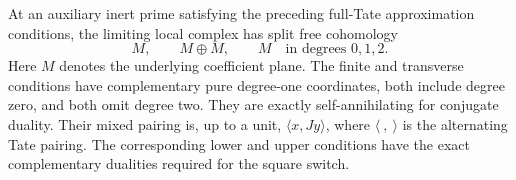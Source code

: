 \begin{lemma}\label{split-local:inert-planes}
At an auxiliary inert prime satisfying the preceding full-Tate approximation conditions, the limiting local complex has split free cohomology
\[
 M,\qquad M\oplus M,\qquad M
 \quad\text{in degrees }0,1,2.
\]
Here \(M\) denotes the underlying coefficient plane. The finite and transverse conditions have complementary pure degree-one coordinates, both include degree zero, and both omit degree two. They are exactly self-annihilating for conjugate duality. Their mixed pairing is, up to a unit, \(\langle x,Jy\rangle\), where \(\langle\ ,\ \rangle\) is the alternating Tate pairing. The corresponding lower and upper conditions have the exact complementary dualities required for the square switch.
\end{lemma}

